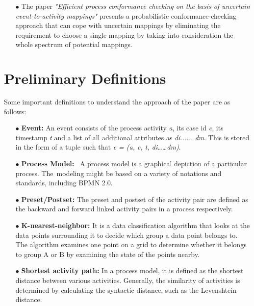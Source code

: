 \documentclass[runningheads]{llncs}
\begin{document}
\begin{itemize}
         \item[$\bullet$] The paper \textit{"Efficient process conformance checking on the basis of uncertain event-to-activity mappings"} presents a probabilistic conformance-checking approach that can cope with uncertain mappings by eliminating the requirement to choose a single mapping by taking into consideration the whole spectrum of potential mappings.
\end{itemize}

\section{Preliminary Definitions}
Some important definitions to understand the approach of the paper are as follows: 
\begin{itemize}
    \item[$\bullet$] \textbf{Event:} An event consists of the process activity \textit{a}, its case id \textit{c}, its timestamp \textit{t} and a list of all additional attributes as \textit{di.......dm}. This is stored in the form of a tuple such that \textit{e = (a, c, t, di……dm)}.\newline
    
     \item[$\bullet$] \textbf{Process Model:}  A process model is a graphical depiction of a particular process. The modeling might be based on a variety of notations and standards, including BPMN 2.0.\newline
    
     \item[$\bullet$] \textbf{Preset/Postset:} The preset and postset of the activity pair are defined as the backward and forward linked activity pairs in a process respectively. \newline
    
    \item[$\bullet$] \textbf{K-nearest-neighbor:} It is a data classification algorithm that looks at the data points surrounding it to decide which group a data point belongs to. The algorithm examines one point on a grid to determine whether it belongs to group A or B by examining the state of the points nearby. \newline
    
    \item[$\bullet$] \textbf{Shortest activity path:} In a process model, it is defined as the shortest distance between various activities. Generally, the similarity of activities is determined by calculating the syntactic distance, such as the Levenshtein distance.\newline
    

\end{itemize}
\end{document}
